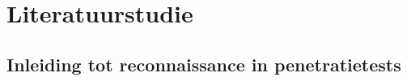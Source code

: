 








\section{Literatuurstudie}%
\label{sec:literatuurstudie}

\autocite{SabiEtAl2016}


\subsection{Inleiding tot reconnaissance in penetratietests}


